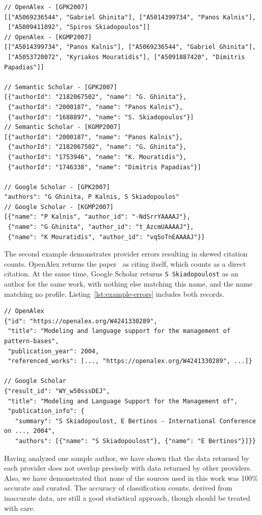 \begin{lstlisting}[float=tb, basicstyle=\footnotesize\ttfamily, caption={Authors of {[GPK2007]} and {[KGMP2007]}, as returned by providers}, label={lst:example-coauthor}]
// OpenAlex - [GPK2007]
[["A5069236544", "Gabriel Ghinita"], ["A5014399734", "Panos Kalnis"],
 ["A5009411092", "Spiros Skiadopoulos"]]
// OpenAlex - [KGMP2007]
[["A5014399734", "Panos Kalnis"], ["A5069236544", "Gabriel Ghinita"],
 ["A5053720072", "Kyriakos Mouratidis"], ["A5091887420", "Dimitris Papadias"]]

// Semantic Scholar - [GPK2007]
[{"authorId": "2182067502", "name": "G. Ghinita"},
 {"authorId": "2000187", "name": "Panos Kalnis"},
 {"authorId": "1688897", "name": "S. Skiadopoulos"}]
// Semantic Scholar - [KGMP2007]
[{"authorId": "2000187", "name": "Panos Kalnis"},
 {"authorId": "2182067502", "name": "G. Ghinita"},
 {"authorId": "1753946", "name": "K. Mouratidis"},
 {"authorId": "1746338", "name": "Dimitris Papadias"}]

// Google Scholar - [GPK2007]
"authors": "G Ghinita, P Kalnis, S Skiadopoulos"
// Google Scholar - [KGMP2007]
[{"name": "P Kalnis", "author_id": "-NdSrrYAAAAJ"},
 {"name": "G Ghinita", "author_id": "t_AzcmUAAAAJ"},
 {"name": "K Mouratidis", "author_id": "vq5oTnEAAAAJ"}]
\end{lstlisting}

The second example demonstrates provider errors resulting in skewed citation counts.
\textsf{OpenAlex} returns the paper~\cite{Terrovitis2004} as citing itself, which counts as a \textsf{direct} citation.
At the same time, \textsf{Google Scholar} returns \texttt{S Skiadopoulost} as an author for the same work, with nothing else matching this name, and the name matching no profile.
Listing~\ref{lst:example-errors} includes both records.

\begin{lstlisting}[float=tb, basicstyle=\footnotesize\ttfamily, caption={Errors in the responses of \textsf{OpenAlex} and \textsf{Google Scholar}}, label={lst:example-errors}]
// OpenAlex
{"id": "https://openalex.org/W4241330289",
 "title": "Modeling and language support for the management of pattern-bases",
 "publication_year": 2004,
 "referenced_works": [..., "https://openalex.org/W4241330289", ...]}

// Google Scholar
{"result_id": "WY_w50sssDEJ",
 "title": "Modeling and Language Support for the Management of",
 "publication_info": {
   "summary": "S Skiadopoulost, E Bertinos - International Conference on ..., 2004",
   "authors": [{"name": "S Skiadopoulost"}, {"name": "E Bertinos"}]}}
\end{lstlisting}

Having analyzed one sample author, we have shown that the data returned by each provider does not overlap precisely with data returned by other providers.
Also, we have demonstrated that none of the sources used in this work was 100\% accurate and curated.
The accuracy of classification counts, derived from inaccurate data, are still a good statistical approach, though should be treated with care.
